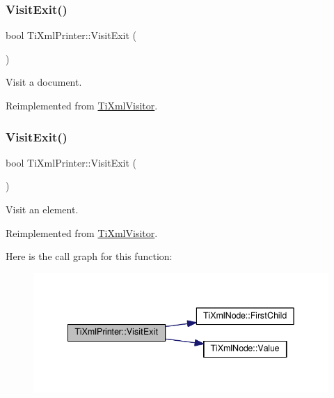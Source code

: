 \subsubsection{\texorpdfstring{Visit\+Exit()}{VisitExit()}\hspace{0.1cm}{\footnotesize\ttfamily [1/2]}}
{\footnotesize\ttfamily bool Ti\+Xml\+Printer\+::\+Visit\+Exit (\begin{DoxyParamCaption}\item[{const \hyperlink{class_ti_xml_document}{Ti\+Xml\+Document} \&}]{ }\end{DoxyParamCaption})\hspace{0.3cm}{\ttfamily [virtual]}}



Visit a document. 



Reimplemented from \hyperlink{class_ti_xml_visitor_aa0ade4f27087447e93974e975c3246ad}{Ti\+Xml\+Visitor}.

\mbox{\label{class_ti_xml_printer_ae6a1df8271df4bf62d7873c38e34aa69}} 
\subsubsection{\texorpdfstring{Visit\+Exit()}{VisitExit()}\hspace{0.1cm}{\footnotesize\ttfamily [2/2]}}
{\footnotesize\ttfamily bool Ti\+Xml\+Printer\+::\+Visit\+Exit (\begin{DoxyParamCaption}\item[{const \hyperlink{class_ti_xml_element}{Ti\+Xml\+Element} \&}]{ }\end{DoxyParamCaption})\hspace{0.3cm}{\ttfamily [virtual]}}



Visit an element. 



Reimplemented from \hyperlink{class_ti_xml_visitor_aec2b1f8116226d52f3a1b95dafd3a32c}{Ti\+Xml\+Visitor}.

Here is the call graph for this function\+:
\nopagebreak
\begin{figure}[H]
\begin{center}
\leavevmode
\includegraphics[width=342pt]{class_ti_xml_printer_ae6a1df8271df4bf62d7873c38e34aa69_cgraph}
\end{center}
\end{figure}


